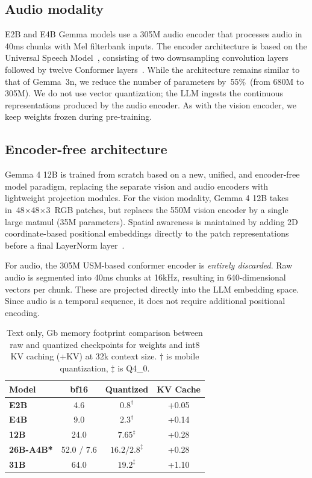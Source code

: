 \documentclass[11pt, a4paper, logo, twocolumn, copyright]{googledeepmind}
\begin{document}
\subsection{Audio modality}
E2B and E4B Gemma models use a 305M audio encoder that processes audio in 40ms chunks with Mel filterbank inputs. The encoder architecture is based on the Universal Speech Model~\citep[USM]{zhang2023google}, consisting of two downsampling convolution layers followed by twelve Conformer layers~\citep{gulati2020conformer}. While the architecture remains similar to that of Gemma~3n, we reduce the number of parameters by~55\%~(from 680M to 305M). We do not use vector quantization; the LLM ingests the continuous representations produced by the audio encoder. As with the vision encoder, we keep weights frozen during pre-training.



\subsection{Encoder-free architecture}
Gemma 4 12B is trained from scratch based on a new, unified, and encoder-free model paradigm, replacing the separate vision and audio encoders with lightweight projection modules. For the vision modality, Gemma 4 12B takes in~48$\times$48$\times$3~RGB patches, but replaces the 550M vision encoder by a single large matmul (35M parameters). Spatial awareness is maintained by adding 2D coordinate-based positional embeddings directly to the patch representations before a final LayerNorm layer~\citep{ba2016layer}.

\noindent{} For audio, the 305M USM-based conformer encoder is \textit{entirely discarded}. Raw audio is segmented into 40ms chunks at 16kHz, resulting in 640-dimensional vectors per chunk. These are projected directly into the LLM embedding space. Since audio is a temporal sequence, it does not require additional positional encoding.

\begin{table}[h!]
 \setlength{\tabcolsep}{5pt}
    \centering
    \begin{tabular}{@{}l c c c@{}}
    \toprule
    Model & bf16 & Quantized & KV Cache \\
    \midrule
        \textbf{E2B} & 4.6 & ${0.8}^{\dagger}$ & +0.05 \\
        \textbf{E4B} & 9.0 & ${2.3}^{\dagger}$ & +0.14 \\
        \textbf{12B} & 24.0 & ${7.65}^{\ddagger}$ & +0.28 \\
        \textbf{26B-A4B*} & 52.0 / 7.6 & ${16.2 / 2.8}^{\ddagger}$ & +0.28 \\
        \textbf{31B} & 64.0 & ${19.2}^{\ddagger}$ & +1.10 \\
    \bottomrule
    \end{tabular}
    \caption{Text only, Gb memory footprint comparison between raw and quantized checkpoints for weights and int8 KV caching (+KV) at 32k context size. $\dagger$ is mobile quantization, $\ddagger$ is Q4\_0.}
    \label{tab:quantization}
\end{table}
\end{document}
